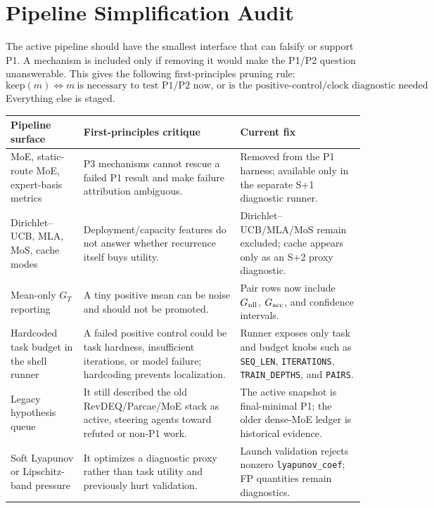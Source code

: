 \documentclass[11pt]{article}
\newcommand{\code}[1]{\texttt{#1}}
\begin{document}
\section{Pipeline Simplification Audit}
\label{sec:pipeline-audit}

The active pipeline should have the smallest interface that can falsify or support P1.  A mechanism
is included only if removing it would make the P1/P2 question unanswerable.  This gives the
following first-principles pruning rule:
\[
  \text{keep}(m)
  \Longleftrightarrow
  m\ \text{is necessary to test P1/P2 now, or is the positive-control/clock diagnostic needed to localize failure.}
\]
Everything else is staged.

\begin{center}
\footnotesize
\renewcommand{\arraystretch}{1.18}
\begin{tabularx}{\textwidth}{@{}L{0.28\textwidth} L{0.34\textwidth} L{0.28\textwidth}@{}}
\toprule
\textbf{Pipeline surface} & \textbf{First-principles critique} & \textbf{Current fix} \\
\midrule
MoE, static-route MoE, expert-basis metrics & P3 mechanisms cannot rescue a failed P1 result and make failure attribution ambiguous. & Removed from the P1 harness; available only in the separate S+1 diagnostic runner. \\
Dirichlet--UCB, MLA, MoS, cache modes & Deployment/capacity features do not answer whether recurrence itself buys utility. & Dirichlet--UCB/MLA/MoS remain excluded; cache appears only as an S+2 proxy diagnostic. \\
Mean-only \(G_T\) reporting & A tiny positive mean can be noise and should not be promoted. & Pair rows now include \(G_{\rm nll}\), \(G_{\rm acc}\), and confidence intervals. \\
Hardcoded task budget in the shell runner & A failed positive control could be task hardness, insufficient iterations, or model failure; hardcoding prevents localization. & Runner exposes only task and budget knobs such as \code{SEQ\_LEN}, \code{ITERATIONS}, \code{TRAIN\_DEPTHS}, and \code{PAIRS}. \\
Legacy hypothesis queue & It still described the old RevDEQ/Parcae/MoE stack as active, steering agents toward refuted or non-P1 work. & The active snapshot is final-minimal P1; the older dense-MoE ledger is historical evidence. \\
Soft Lyapunov or Lipschitz-band pressure & It optimizes a diagnostic proxy rather than task utility and previously hurt validation. & Launch validation rejects nonzero \code{lyapunov\_coef}; FP quantities remain diagnostics. \\
\bottomrule
\end{tabularx}
\end{center}
\end{document}
